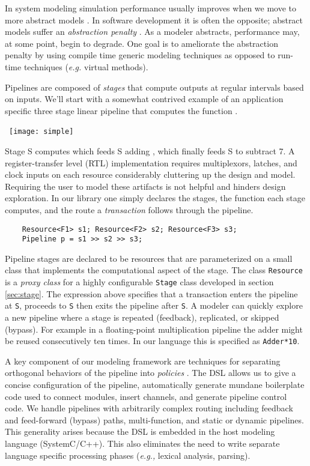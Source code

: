 \documentclass{entcs}
\begin{document}
In system modeling simulation performance usually improves when we move to more abstract
models \cite{glms:systemc}. In software development it is often the opposite; abstract models suffer
an {\em abstraction penalty} \cite{veldhuizen99}. As a modeler
abstracts, performance may, at some point, begin to degrade. One goal is to ameliorate
the abstraction penalty by using compile time generic modeling techniques as opposed to
run-time techniques ({\em e.g.} virtual methods).

Pipelines are composed of {\em stages} that compute outputs at regular
intervals based on inputs. We'll start with a somewhat contrived example
of an application specific three stage linear pipeline that computes the
function .

\vspace{1em}
\mbox{
  \texttt{[image: simple]}
}
\vspace{1em}

Stage S computes  which feeds S adding
, which finally feeds S to subtract 7.
A register-transfer level (RTL) implementation requires multiplexors, latches, and clock
inputs on each resource considerably cluttering up the design and model.
Requiring the user to model these artifacts is not helpful and hinders design exploration.
In our library one simply declares the stages, the function each stage computes, and the route
a {\em transaction} follows through the pipeline.
\begin{verbatim}
    Resource<F1> s1; Resource<F2> s2; Resource<F3> s3;
    Pipeline p = s1 >> s2 >> s3;
\end{verbatim}
Pipeline stages are declared to be resources that are parameterized on a small class that
implements the computational aspect of the stage. The class {\tt Resource} is a
{\em proxy class} for a highly configurable {\tt Stage} class developed in
section \ref{sec:stage}.
The expression above specifies that a
transaction enters the pipeline at {\tt S}, proceeds to {\tt S}
then exits the pipeline after {\tt S}. A modeler can quickly explore a new pipeline where
a stage is repeated (feedback), replicated, or skipped (bypass). For example in a floating-point
multiplication pipeline the adder might be reused consecutively ten times.
In our language this is specified as {\tt Adder*10}.

A key component of our modeling framework are techniques for separating orthogonal
behaviors of the pipeline
into {\em policies} \cite{Alexandrescu01}. The DSL allows us to give a concise configuration of
the pipeline, automatically generate mundane boilerplate code used to
connect modules, insert channels, and generate pipeline control code.
We handle pipelines with arbitrarily complex routing
including feedback and feed-forward (bypass) paths, multi-function, and static or
dynamic pipelines. This generality arises because the DSL is embedded in the host
modeling language (SystemC/C++). This also eliminates the need to write separate language specific
processing phases ({\em e.g.,} lexical analysis, parsing).
\end{document}

